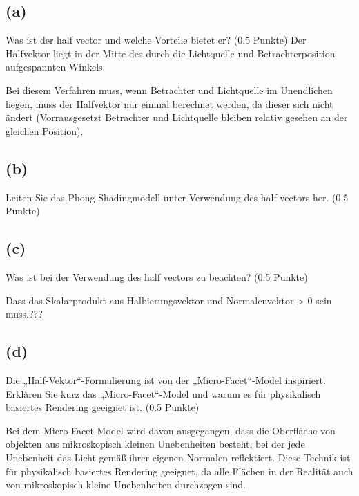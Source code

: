 \documentclass[12pt]{scrreprt}
\begin{document}
\subsection*{(a)}
Was ist der half vector und welche Vorteile bietet er? (0.5 Punkte)
Der Halfvektor liegt in der Mitte des durch die Lichtquelle und Betrachterposition aufgespannten Winkels.

Bei diesem Verfahren muss, wenn Betrachter und Lichtquelle im Unendlichen liegen, muss der Halfvektor nur einmal berechnet werden, da dieser sich nicht ändert (Vorrausgesetzt Betrachter und Lichtquelle bleiben relativ gesehen an der gleichen Position).
\subsection*{(b)}
Leiten Sie das Phong Shadingmodell unter Verwendung des half vectors her. (0.5 Punkte)



\subsection*{(c)}
Was ist bei der Verwendung des half vectors zu beachten? (0.5 Punkte)

Dass das Skalarprodukt aus Halbierungsvektor und Normalenvektor > 0 sein muss.???
\subsection*{(d)}
Die „Half-Vektor“-Formulierung ist von der „Micro-Facet“-Model inspiriert. Erklären Sie kurz
das „Micro-Facet“-Model und warum es für physikalisch basiertes Rendering geeignet ist. (0.5
Punkte)

Bei dem Micro-Facet Model wird davon ausgegangen, dass die Oberfläche von objekten aus mikroskopisch kleinen Unebenheiten besteht, bei der jede Unebenheit das Licht gemäß ihrer eigenen Normalen reflektiert. Diese Technik ist für physikalisch basiertes Rendering geeignet, da alle Flächen in der Realität auch von mikroskopisch kleine Unebenheiten durchzogen sind.
\end{document}
